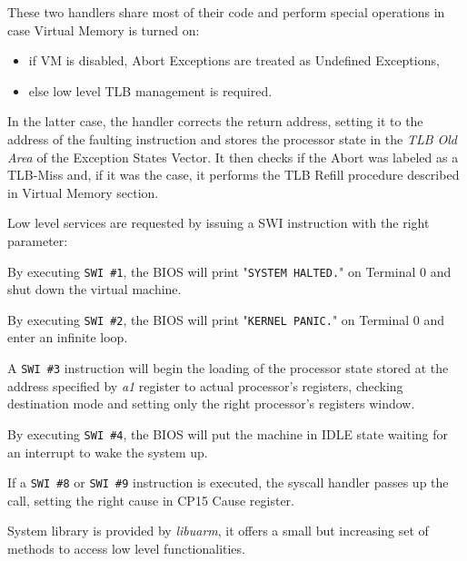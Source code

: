 
These two handlers share most of their code and perform special operations in case Virtual Memory is turned on:
\begin{itemize}
	\item if VM is disabled, Abort Exceptions are treated as Undefined Exceptions,
	\item else low level TLB management is required.
\end{itemize}

In the latter case, the handler corrects the return address, setting it to the address of the faulting instruction and stores the processor state in the \emph{TLB Old Area} of the Exception States Vector.
It then checks if the Abort was labeled as a TLB-Miss and, if it was the case, it performs the TLB Refill procedure described in Virtual Memory section.


Low level services are requested by issuing a SWI instruction with the right parameter:


By executing \texttt{SWI \#1}, the BIOS will print "\texttt{SYSTEM HALTED.}" on Terminal 0 and shut down the virtual machine.


By executing \texttt{SWI \#2}, the BIOS will print "\texttt{KERNEL PANIC.}" on Terminal 0 and enter an infinite loop.


A \texttt{SWI \#3} instruction will begin the loading of the processor state stored at the address specified by \emph{a1} register to actual processor's registers, checking destination mode and setting only the right processor's registers window.


By executing \texttt{SWI \#4}, the BIOS will put the machine in IDLE state waiting for an interrupt to wake the system up.


If a \texttt{SWI \#8} or \texttt{SWI \#9} instruction is executed, the syscall handler passes up the call, setting the right cause in CP15 Cause register.


System library is provided by \emph{libuarm}, it offers a small but increasing set of methods to access low level functionalities.

